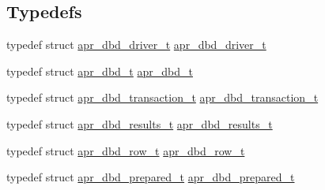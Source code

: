 \subsection*{Typedefs}
\begin{DoxyCompactItemize}
\item 
typedef struct \hyperlink{structapr__dbd__driver__t}{apr\+\_\+dbd\+\_\+driver\+\_\+t} \hyperlink{group__APR__Util__DBD_ga91778287e3cd1b8ef8719ca2655e2bc8}{apr\+\_\+dbd\+\_\+driver\+\_\+t}
\item 
typedef struct \hyperlink{group__APR__Util__DBD_ga4738c1f6340184987fc7806522c18ab8}{apr\+\_\+dbd\+\_\+t} \hyperlink{group__APR__Util__DBD_ga4738c1f6340184987fc7806522c18ab8}{apr\+\_\+dbd\+\_\+t}
\item 
typedef struct \hyperlink{group__APR__Util__DBD_ga92eb10d7ec8fdb3a39a7d6fdfffdf8fb}{apr\+\_\+dbd\+\_\+transaction\+\_\+t} \hyperlink{group__APR__Util__DBD_ga92eb10d7ec8fdb3a39a7d6fdfffdf8fb}{apr\+\_\+dbd\+\_\+transaction\+\_\+t}
\item 
typedef struct \hyperlink{group__APR__Util__DBD_ga6765891011818912e1b52fef773bfce6}{apr\+\_\+dbd\+\_\+results\+\_\+t} \hyperlink{group__APR__Util__DBD_ga6765891011818912e1b52fef773bfce6}{apr\+\_\+dbd\+\_\+results\+\_\+t}
\item 
typedef struct \hyperlink{group__APR__Util__DBD_gab890e4650a1de51725142318825103a5}{apr\+\_\+dbd\+\_\+row\+\_\+t} \hyperlink{group__APR__Util__DBD_gab890e4650a1de51725142318825103a5}{apr\+\_\+dbd\+\_\+row\+\_\+t}
\item 
typedef struct \hyperlink{group__APR__Util__DBD_ga1f1179c6480a2ee0134f2cb881106cd3}{apr\+\_\+dbd\+\_\+prepared\+\_\+t} \hyperlink{group__APR__Util__DBD_ga1f1179c6480a2ee0134f2cb881106cd3}{apr\+\_\+dbd\+\_\+prepared\+\_\+t}
\end{DoxyCompactItemize}
